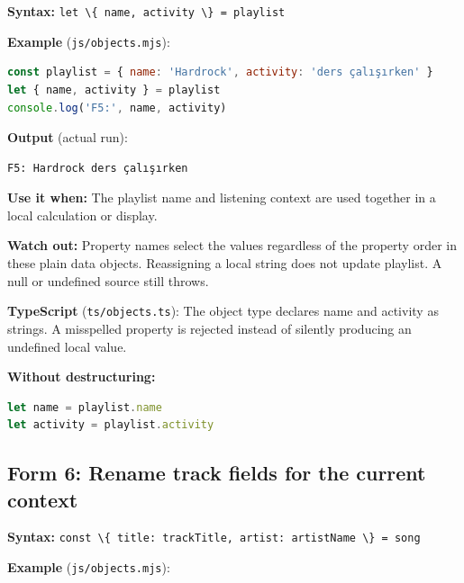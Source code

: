 \documentclass[
  10pt,
  a4paper,
  titlepage]{article}
\newcommand{\passthrough}[1]{#1}
\begin{document}
\textbf{Syntax:}
\passthrough{\lstinline!let \{ name, activity \} = playlist!}


\textbf{Example} (\passthrough{\lstinline!js/objects.mjs!}):

\Needspace{51.5pt}
\begin{lstlisting}[language=JavaScript]
const playlist = { name: 'Hardrock', activity: 'ders çalışırken' }
let { name, activity } = playlist
console.log('F5:', name, activity)
\end{lstlisting}


\textbf{Output} (actual run):

\Needspace{30.9pt}
\begin{lstlisting}
F5: Hardrock ders çalışırken
\end{lstlisting}

\textbf{Use it when:} The playlist name and listening context are used
together in a local calculation or display.

\textbf{Watch out:} Property names select the values regardless of the
property order in these plain data objects. Reassigning a local string
does not update playlist. A null or undefined source still throws.

\textbf{TypeScript} (\passthrough{\lstinline!ts/objects.ts!}): The
object type declares name and activity as strings. A misspelled property
is rejected instead of silently producing an undefined local value.


\textbf{Without destructuring:}

\Needspace{41.2pt}
\begin{lstlisting}[language=JavaScript]
let name = playlist.name
let activity = playlist.activity
\end{lstlisting}

\subsection{Form 6: Rename track fields for the current
context}\label{form-6-rename-track-fields-for-the-current-context}

\textbf{Syntax:}
\passthrough{\lstinline!const \{ title: trackTitle, artist: artistName \} = song!}


\textbf{Example} (\passthrough{\lstinline!js/objects.mjs!}):
\end{document}
